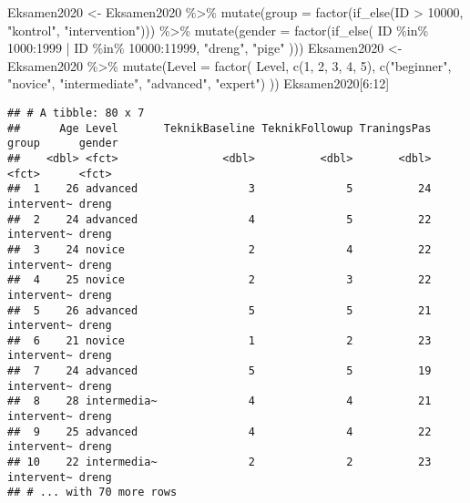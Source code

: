 \documentclass[
]{article}
\newenvironment{Shaded}{\begin{snugshade}}{\end{snugshade}}
\newcommand{\AttributeTok}[1]{\textcolor[rgb]{0.77,0.63,0.00}{#1}}
\newcommand{\DecValTok}[1]{\textcolor[rgb]{0.00,0.00,0.81}{#1}}
\newcommand{\FunctionTok}[1]{\textcolor[rgb]{0.00,0.00,0.00}{#1}}
\newcommand{\NormalTok}[1]{#1}
\newcommand{\OtherTok}[1]{\textcolor[rgb]{0.56,0.35,0.01}{#1}}
\newcommand{\SpecialCharTok}[1]{\textcolor[rgb]{0.00,0.00,0.00}{#1}}
\newcommand{\StringTok}[1]{\textcolor[rgb]{0.31,0.60,0.02}{#1}}
\begin{document}
\begin{Shaded}
\begin{Highlighting}[]
\NormalTok{Eksamen2020 }\OtherTok{\textless{}{-}}
\NormalTok{  Eksamen2020 }\SpecialCharTok{\%\textgreater{}\%}
  \FunctionTok{mutate}\NormalTok{(}\AttributeTok{group =} \FunctionTok{factor}\NormalTok{(}\FunctionTok{if\_else}\NormalTok{(ID }\SpecialCharTok{\textgreater{}} \DecValTok{10000}\NormalTok{, }\StringTok{"kontrol"}\NormalTok{, }\StringTok{"intervention"}\NormalTok{))) }\SpecialCharTok{\%\textgreater{}\%}
  \FunctionTok{mutate}\NormalTok{(}\AttributeTok{gender =} \FunctionTok{factor}\NormalTok{(}\FunctionTok{if\_else}\NormalTok{(}
\NormalTok{    ID }\SpecialCharTok{\%in\%} \DecValTok{1000}\SpecialCharTok{:}\DecValTok{1999} \SpecialCharTok{|}
\NormalTok{      ID }\SpecialCharTok{\%in\%} \DecValTok{10000}\SpecialCharTok{:}\DecValTok{11999}\NormalTok{, }\StringTok{"dreng"}\NormalTok{, }\StringTok{"pige"}
\NormalTok{  )))}
\NormalTok{Eksamen2020 }\OtherTok{\textless{}{-}}\NormalTok{ Eksamen2020 }\SpecialCharTok{\%\textgreater{}\%}
  \FunctionTok{mutate}\NormalTok{(}\AttributeTok{Level =} \FunctionTok{factor}\NormalTok{(}
\NormalTok{    Level,}
    \FunctionTok{c}\NormalTok{(}\DecValTok{1}\NormalTok{, }\DecValTok{2}\NormalTok{, }\DecValTok{3}\NormalTok{, }\DecValTok{4}\NormalTok{, }\DecValTok{5}\NormalTok{),}
    \FunctionTok{c}\NormalTok{(}\StringTok{"beginner"}\NormalTok{, }\StringTok{"novice"}\NormalTok{, }\StringTok{"intermediate"}\NormalTok{, }\StringTok{"advanced"}\NormalTok{, }\StringTok{"expert"}\NormalTok{)}
\NormalTok{  ))}
\NormalTok{Eksamen2020[}\DecValTok{6}\SpecialCharTok{:}\DecValTok{12}\NormalTok{]}
\end{Highlighting}
\end{Shaded}

\begin{verbatim}
## # A tibble: 80 x 7
##      Age Level       TeknikBaseline TeknikFollowup TraningsPas group      gender
##    <dbl> <fct>                <dbl>          <dbl>       <dbl> <fct>      <fct> 
##  1    26 advanced                 3              5          24 intervent~ dreng 
##  2    24 advanced                 4              5          22 intervent~ dreng 
##  3    24 novice                   2              4          22 intervent~ dreng 
##  4    25 novice                   2              3          22 intervent~ dreng 
##  5    26 advanced                 5              5          21 intervent~ dreng 
##  6    21 novice                   1              2          23 intervent~ dreng 
##  7    24 advanced                 5              5          19 intervent~ dreng 
##  8    28 intermedia~              4              4          21 intervent~ dreng 
##  9    25 advanced                 4              4          22 intervent~ dreng 
## 10    22 intermedia~              2              2          23 intervent~ dreng 
## # ... with 70 more rows
\end{verbatim}
\end{document}

